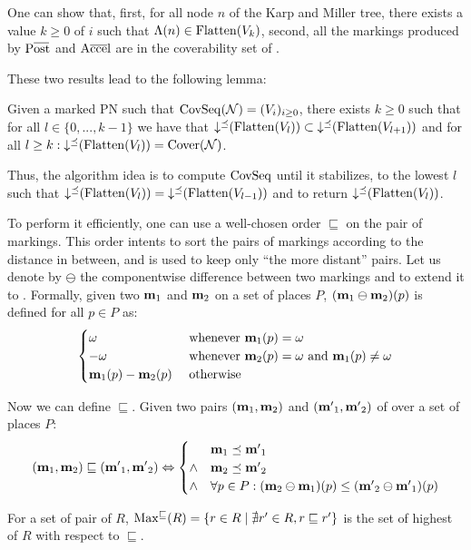 One can show that,
first, for all node $n$ of the Karp and Miller tree, there exists a value $k \geq 0$ of $i$ such that $\Lambda(n) \in \operatorname{Flatten}(V_k)$,
second, all the markings produced by $\Postb$ and $\operatorname{A\overline{cce}l}$ are in the coverability set of \N.

These two results lead to the following lemma:
\begin{lemm}
  Given a marked \ac{PN} \N such that $\operatorname{CovSeq}(\mathcal{N}) = (V_i)_{i \geq 0}$,
  there exists $k \geq 0$ such that for all $l \in \{0, ..., k-1\}$ we have that $\operatorname{\downarrow^\preceq}(\operatorname{Flatten}(V_l)) \subset \operatorname{\downarrow^\preceq}(\operatorname{Flatten}(V_{l+1}))$
  and for all $l \geq k : \operatorname{\downarrow^\preceq}(\operatorname{Flatten}(V_l)) = \operatorname{Cover}(\mathcal{N})$.
\end{lemm}

Thus, the algorithm idea is to compute $\operatorname{CovSeq}$ until it stabilizes,  to the lowest $l$ such that $\operatorname{\downarrow^\preceq}(\operatorname{Flatten}(V_l)) = \operatorname{\downarrow^\preceq}(\operatorname{Flatten}(V_{l-1}))$ and to return $\operatorname{\downarrow^\preceq}(\operatorname{Flatten}(V_l))$.

To perform it efficiently, one can use a well-chosen order $\sqsubseteq$ on the pair of markings.
This order intents to sort the pairs of markings according to the distance in between, and is used to keep only ``the more distant'' pairs.
Let us denote by $\ominus$ the componentwise difference between two markings and to extend it to \omarks.
Formally, given two \omarks $\mathbf{m}_1$ and $\mathbf{m}_2$ on a set of places $P$, $(\mathbf{m}_1 \ominus \mathbf{m}_2)(p)$ is defined for all $p \in P$ as:
\[
  \begin{cases}
    \omega & \text{ whenever } \mathbf{m}_1(p) = \omega \\
    -\omega & \text{ whenever } \mathbf{m}_2(p) = \omega \text{ and } \mathbf{m}_1(p) \neq \omega \\
    \mathbf{m}_1(p) - \mathbf{m}_2(p) & \text{ otherwise}
  \end{cases}
\]

Now we can define $\sqsubseteq$.
Given two pairs $(\mathbf{m}_1, \mathbf{m}_2)$ and $(\mathbf{m'}_1, \mathbf{m'}_2)$ of \omarks over a set of places $P$:
\[
  (\mathbf{m}_1, \mathbf{m}_2) \sqsubseteq (\mathbf{m'}_1, \mathbf{m'}_2) \Leftrightarrow
  \begin{cases}
    & \mathbf{m}_1 \preceq \mathbf{m'}_1 \\
    \wedge & \mathbf{m}_2 \preceq \mathbf{m'}_2 \\
    \wedge & \forall p \in P : (\mathbf{m}_2 \ominus \mathbf{m}_1)(p) \leq (\mathbf{m'}_2 \ominus \mathbf{m'}_1)(p)
  \end{cases}
\]

For a set of pair of \omarks $R$, $\operatorname{Max^\sqsubseteq}(R) = \{ r \in R \mid \nexists r' \in R, r \sqsubseteq r'\}$ is the set of highest \omark of $R$ with respect to $\sqsubseteq$.

